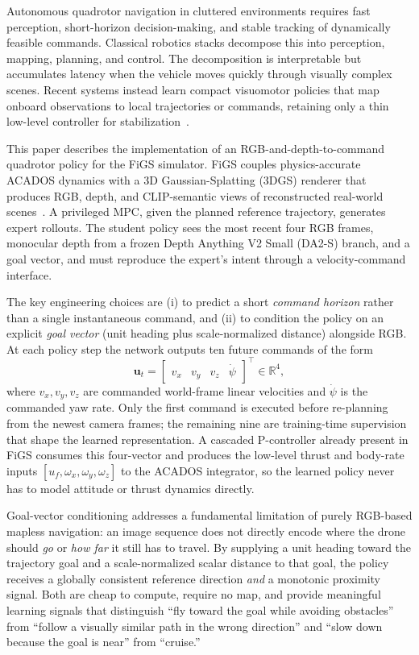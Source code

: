 \documentclass[10pt,twocolumn,letterpaper]{article}
\begin{document}
Autonomous quadrotor navigation in cluttered environments requires fast perception, short-horizon decision-making, and stable tracking of dynamically feasible commands. Classical robotics stacks decompose this into perception, mapping, planning, and control. The decomposition is interpretable but accumulates latency when the vehicle moves quickly through visually complex scenes. Recent systems instead learn compact visuomotor policies that map onboard observations to local trajectories or commands, retaining only a thin low-level controller for stabilization~\cite{loquercio2021learning,low2024sousvide}.

This paper describes the implementation of an RGB-and-depth-to-command quadrotor policy for the FiGS simulator. FiGS couples physics-accurate ACADOS dynamics with a 3D Gaussian-Splatting (3DGS) renderer that produces RGB, depth, and CLIP-semantic views of reconstructed real-world scenes~\cite{low2024sousvide,kerbl2023gaussian}. A privileged MPC, given the planned reference trajectory, generates expert rollouts. The student policy sees the most recent four RGB frames, monocular depth from a frozen Depth Anything V2 Small (DA2-S) branch, and a goal vector, and must reproduce the expert's intent through a velocity-command interface.

The key engineering choices are (i) to predict a short \emph{command horizon} rather than a single instantaneous command, and (ii) to condition the policy on an explicit \emph{goal vector} (unit heading plus scale-normalized distance) alongside RGB. At each policy step the network outputs ten future commands of the form
\begin{equation}
\label{eq:command}
\mathbf{u}_t = \begin{bmatrix} v_x & v_y & v_z & \dot{\psi} \end{bmatrix}^\top \in \mathbb{R}^4,
\end{equation}
where $v_x, v_y, v_z$ are commanded world-frame linear velocities and $\dot{\psi}$ is the commanded yaw rate. Only the first command is executed before re-planning from the newest camera frames; the remaining nine are training-time supervision that shape the learned representation. A cascaded P-controller already present in FiGS consumes this four-vector and produces the low-level thrust and body-rate inputs $[u_f, \omega_x, \omega_y, \omega_z]$ to the ACADOS integrator, so the learned policy never has to model attitude or thrust dynamics directly.

Goal-vector conditioning addresses a fundamental limitation of purely RGB-based mapless navigation: an image sequence does not directly encode where the drone should \emph{go} or \emph{how far} it still has to travel. By supplying a unit heading toward the trajectory goal and a scale-normalized scalar distance to that goal, the policy receives a globally consistent reference direction \emph{and} a monotonic proximity signal. Both are cheap to compute, require no map, and provide meaningful learning signals that distinguish ``fly toward the goal while avoiding obstacles'' from ``follow a visually similar path in the wrong direction'' and ``slow down because the goal is near'' from ``cruise.''
\end{document}
